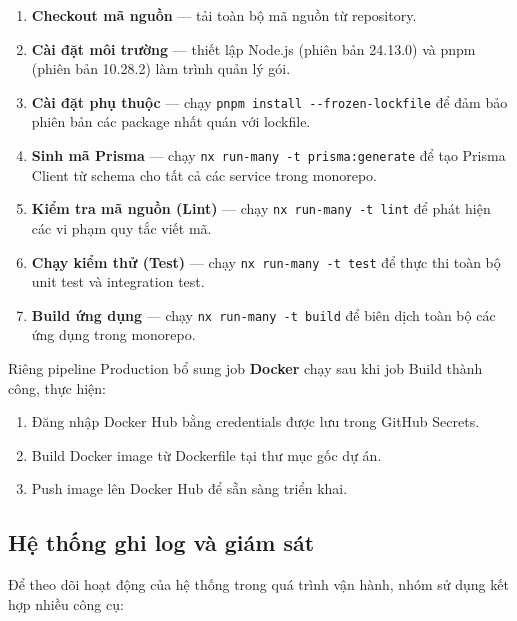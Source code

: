 \begin{enumerate}
    \item \textbf{Checkout mã nguồn} --- tải toàn bộ mã nguồn từ repository.
    \item \textbf{Cài đặt môi trường} --- thiết lập Node.js (phiên bản 24.13.0) và pnpm (phiên bản 10.28.2) làm trình quản lý gói.
    \item \textbf{Cài đặt phụ thuộc} --- chạy \texttt{pnpm install -{}-frozen-lockfile} để đảm bảo phiên bản các package nhất quán với lockfile.
    \item \textbf{Sinh mã Prisma} --- chạy \texttt{nx run-many -t prisma:generate} để tạo Prisma Client từ schema cho tất cả các service trong monorepo.
    \item \textbf{Kiểm tra mã nguồn (Lint)} --- chạy \texttt{nx run-many -t lint} để phát hiện các vi phạm quy tắc viết mã.
    \item \textbf{Chạy kiểm thử (Test)} --- chạy \texttt{nx run-many -t test} để thực thi toàn bộ unit test và integration test.
    \item \textbf{Build ứng dụng} --- chạy \texttt{nx run-many -t build} để biên dịch toàn bộ các ứng dụng trong monorepo.
\end{enumerate}

\noindent Riêng pipeline Production bổ sung job \textbf{Docker} chạy sau khi job Build thành công, thực hiện:

\begin{enumerate}
    \item Đăng nhập Docker Hub bằng credentials được lưu trong GitHub Secrets.
    \item Build Docker image từ Dockerfile tại thư mục gốc dự án.
    \item Push image lên Docker Hub để sẵn sàng triển khai.
\end{enumerate}

\subsection{Hệ thống ghi log và giám sát}

Để theo dõi hoạt động của hệ thống trong quá trình vận hành, nhóm sử dụng kết hợp nhiều công cụ:

